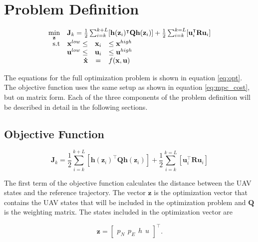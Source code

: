 \section{Problem Definition}

\begin{equation}
\label{eq:opt}
	\begin{array}{rrclcl}
		\displaystyle \min_{\mathbf{z}} & \multicolumn{3}{l}{\mathbf{J}_k = \frac{1}{2} \sum_{i=k}^{k+L} [\mathbf{h}(\mathbf{z}_i)^\intercal \mathbf{Q}\mathbf{h}(\mathbf{z}_i)] + \frac{1}{2}\sum_{i=k}^{k=L}[\mathbf{u}_i^\intercal \mathbf{R}\mathbf{u}_i]}\\
		\textrm{s.t}
		& \mathbf{x}^{low} \leq & \mathbf{x}_i & \leq \mathbf{x}^{high} \\
		& \mathbf{u}^{low} \leq & \mathbf{u}_i & \leq \mathbf{u}^{high} \\
		& \displaystyle \mathbf{\dot{x}} & = & f(\mathbf{x},\mathbf{u})
	\end{array}
\end{equation}

The equations for the full optimization problem is shown in equation \ref{eq:opt}. The objective function uses the same setup as shown in equation \ref{eq:mpc_cost}, but on matrix form. Each of the three components of the problem definition will be described in detail in the following sections.


\subsection{Objective Function}

\begin{equation}
	\mathbf{J}_k = \frac{1}{2} \sum_{i=k}^{k+L} [\mathbf{h}(\mathbf{z}_i)^\intercal \mathbf{Q}\mathbf{h}(\mathbf{z}_i)] + \frac{1}{2}\sum_{i=k}^{k=L}[\mathbf{u}_i^\intercal \mathbf{R}\mathbf{u}_i]
\end{equation}

The first term of the objective function calculates the distance between the UAV states and the reference trajectory. The vector $\mathbf{z}$ is the optimization vector that contains the UAV states that will be included in the optimization problem and $\mathbf{Q}$ is the weighting matrix. The states included in the optimization vector are

\begin{equation}
	\mathbf{z} =
	\begin{bmatrix}
		p_N \hspace{5pt} p_E \hspace{5pt} h \hspace{5pt} u
	\end{bmatrix} ^\intercal .
\end{equation}

